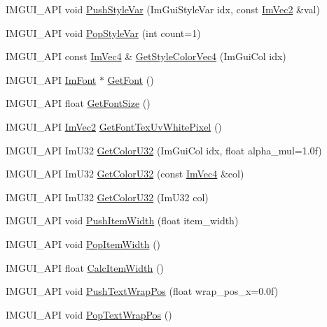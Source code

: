 \begin{DoxyCompactItemize}
\item 
I\+M\+G\+U\+I\+\_\+\+A\+PI void \hyperlink{namespace_im_gui_ae404b6978e9aedec5c16627d8c45f923}{Push\+Style\+Var} (Im\+Gui\+Style\+Var idx, const \hyperlink{struct_im_vec2}{Im\+Vec2} \&val)
\item 
I\+M\+G\+U\+I\+\_\+\+A\+PI void \hyperlink{namespace_im_gui_a14116e57d81e326adef2a702e65781d4}{Pop\+Style\+Var} (int count=1)
\item 
I\+M\+G\+U\+I\+\_\+\+A\+PI const \hyperlink{struct_im_vec4}{Im\+Vec4} \& \hyperlink{namespace_im_gui_ad838e580972e2c4b3da2b0f60754b662}{Get\+Style\+Color\+Vec4} (Im\+Gui\+Col idx)
\item 
I\+M\+G\+U\+I\+\_\+\+A\+PI \hyperlink{struct_im_font}{Im\+Font} $\ast$ \hyperlink{namespace_im_gui_a43cf349576e20fac4a1300269320ad8f}{Get\+Font} ()
\item 
I\+M\+G\+U\+I\+\_\+\+A\+PI float \hyperlink{namespace_im_gui_ac592ae8e0aa4a1a06502ec7872bc8da8}{Get\+Font\+Size} ()
\item 
I\+M\+G\+U\+I\+\_\+\+A\+PI \hyperlink{struct_im_vec2}{Im\+Vec2} \hyperlink{namespace_im_gui_a3092da6abc1d04f3287c084435dc6026}{Get\+Font\+Tex\+Uv\+White\+Pixel} ()
\item 
I\+M\+G\+U\+I\+\_\+\+A\+PI Im\+U32 \hyperlink{namespace_im_gui_a0de2d9bd347d9866511eb8d014e62556}{Get\+Color\+U32} (Im\+Gui\+Col idx, float alpha\+\_\+mul=1.\+0f)
\item 
I\+M\+G\+U\+I\+\_\+\+A\+PI Im\+U32 \hyperlink{namespace_im_gui_ac701752365ddd58cecc1956fc62921a8}{Get\+Color\+U32} (const \hyperlink{struct_im_vec4}{Im\+Vec4} \&col)
\item 
I\+M\+G\+U\+I\+\_\+\+A\+PI Im\+U32 \hyperlink{namespace_im_gui_a834649713437e8fdfa0e5a4fb780d35b}{Get\+Color\+U32} (Im\+U32 col)
\item 
I\+M\+G\+U\+I\+\_\+\+A\+PI void \hyperlink{namespace_im_gui_a4ad13bf38f0521a339133248ef3e3036}{Push\+Item\+Width} (float item\+\_\+width)
\item 
I\+M\+G\+U\+I\+\_\+\+A\+PI void \hyperlink{namespace_im_gui_ad29a3fc0cb5dfc7f9fc7224512ce90bf}{Pop\+Item\+Width} ()
\item 
I\+M\+G\+U\+I\+\_\+\+A\+PI float \hyperlink{namespace_im_gui_ab3b3ba92ebd8bca4a552dd93321a1994}{Calc\+Item\+Width} ()
\item 
I\+M\+G\+U\+I\+\_\+\+A\+PI void \hyperlink{namespace_im_gui_ab3b203dc94e7ee61a524609b3f3be50a}{Push\+Text\+Wrap\+Pos} (float wrap\+\_\+pos\+\_\+x=0.\+0f)
\item 
I\+M\+G\+U\+I\+\_\+\+A\+PI void \hyperlink{namespace_im_gui_a08000421b9cc13757430efe54178ae0f}{Pop\+Text\+Wrap\+Pos} ()

\end{DoxyCompactItemize}
